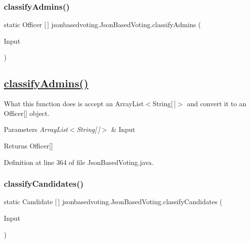 \subsubsection{\texorpdfstring{classifyAdmins()}{classifyAdmins()}}
{\footnotesize\ttfamily static Officer \mbox{[}$\,$\mbox{]} jsonbasedvoting.\+Json\+Based\+Voting.\+classify\+Admins (\begin{DoxyParamCaption}\item[{Array\+List$<$ String\mbox{[}$\,$\mbox{]}$>$}]{Input }\end{DoxyParamCaption})\hspace{0.3cm}{\ttfamily [static]}}

\subsection*{\mbox{\hyperlink{classjsonbasedvoting_1_1_json_based_voting_a8ae3b015105859acfa80cfcf3e481174}{classify\+Admins()}} }

What this function does is accept an Array\+List$<$\+String\mbox{[}$\,$\mbox{]}$>$ and convert it to an Officer\mbox{[}\mbox{]} object. 
\begin{DoxyParams}{Parameters}
{\em Array\+List$<$\+String\mbox{[}$\,$\mbox{]}$>$} & Input \\
\hline
\end{DoxyParams}
\begin{DoxyReturn}{Returns}
Officer\mbox{[}\mbox{]} 
\end{DoxyReturn}


Definition at line 364 of file Json\+Based\+Voting.\+java.

\mbox{\label{classjsonbasedvoting_1_1_json_based_voting_a09a09c0673c510a648d225136e4cf259}} 
\subsubsection{\texorpdfstring{classifyCandidates()}{classifyCandidates()}}
{\footnotesize\ttfamily static Candidate \mbox{[}$\,$\mbox{]} jsonbasedvoting.\+Json\+Based\+Voting.\+classify\+Candidates (\begin{DoxyParamCaption}\item[{Array\+List$<$ String\mbox{[}$\,$\mbox{]}$>$}]{Input }\end{DoxyParamCaption})\hspace{0.3cm}{\ttfamily [static]}}

